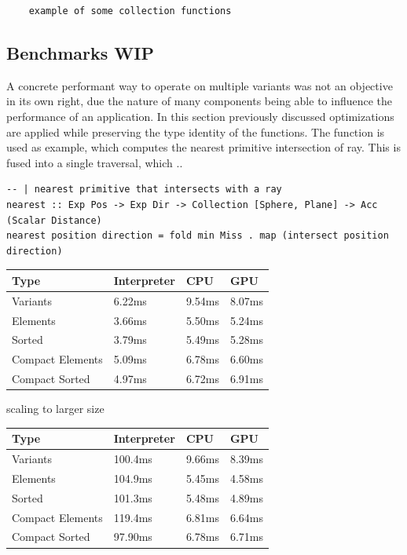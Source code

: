 \documentclass{article}
\newcommand{\type}[1]{\smash{\colorbox{codegray}{\texttt{#1}}}}
\begin{document}
\begin{verbatim}
    example of some collection functions
\end{verbatim}


\newpage

\subsection{Benchmarks WIP}

A concrete performant way to operate on multiple variants was not an objective in its own right, due the nature of many components being able to influence the performance of an application.
In this section previously discussed optimizations are applied while preserving the type identity of the functions.
The \type{nearest} function is used as example, which computes the nearest primitive intersection of ray.
This is fused into a single traversal, which ..

\begin{verbatim}
-- | nearest primitive that intersects with a ray
nearest :: Exp Pos -> Exp Dir -> Collection [Sphere, Plane] -> Acc (Scalar Distance)
nearest position direction = fold min Miss . map (intersect position direction)
\end{verbatim}



\begin{center}
    \begin{tabular}{ | m{14em} | m{8em}| m{8em} | m{8em} | } 
      \hline
      {\bf Type} & {\bf Interpreter} & {\bf CPU} & {\bf GPU} \\ 
      \hline
      Variants         & 6.22ms & 9.54ms & 8.07ms\\ 
      \hline
      Elements         & 3.66ms & 5.50ms & 5.24ms\\ 
      \hline
      Sorted           & 3.79ms & 5.49ms & 5.28ms\\ 
      \hline
      Compact Elements & 5.09ms & 6.78ms & 6.60ms\\ 
      \hline
      Compact Sorted   & 4.97ms & 6.72ms & 6.91ms\\ 
      \hline
    \end{tabular}
\end{center}

scaling to larger size

\begin{center}
    \begin{tabular}{ | m{14em} | m{8em}| m{8em} | m{8em} | } 
      \hline
      {\bf Type} & {\bf Interpreter} & {\bf CPU} & {\bf GPU} \\ 
      \hline
      Variants         & 100.4ms & 9.66ms & 8.39ms \\ 
      \hline
      Elements         & 104.9ms & 5.45ms & 4.58ms \\ 
      \hline
      Sorted           & 101.3ms & 5.48ms & 4.89ms \\ 
      \hline
      Compact Elements & 119.4ms & 6.81ms & 6.64ms \\ 
      \hline
      Compact Sorted   & 97.90ms & 6.78ms & 6.71ms \\ 
      \hline
    \end{tabular}
\end{center}
\end{document}
